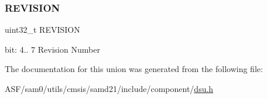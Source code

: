 \subsubsection{\texorpdfstring{REVISION}{REVISION}}
{\footnotesize\ttfamily uint32\+\_\+t R\+E\+V\+I\+S\+I\+ON}

bit\+: 4.. 7 Revision Number 

The documentation for this union was generated from the following file\+:\begin{DoxyCompactItemize}
\item 
A\+S\+F/sam0/utils/cmsis/samd21/include/component/\mbox{\hyperlink{component_2dsu_8h}{dsu.\+h}}\end{DoxyCompactItemize}
